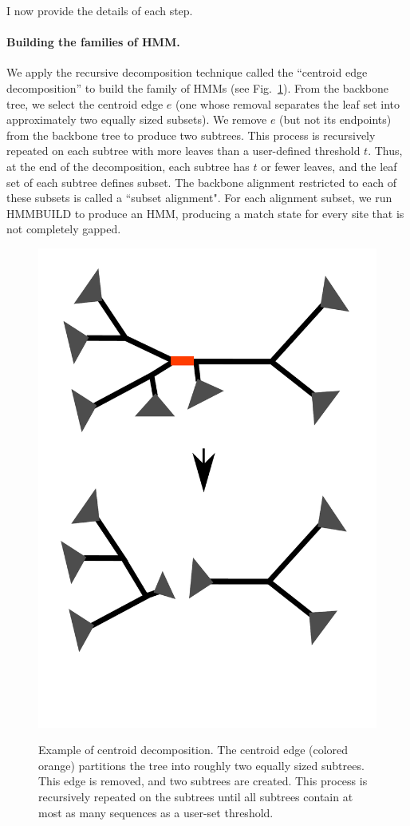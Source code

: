 I now provide the details of each step.

\paragraph{Building the families of HMM.}
We apply the recursive decomposition technique called the 
``centroid edge decomposition'' \cite{Liu2012} 
to build the family of HMMs (see Fig.~\ref{hmmfamily:decomp}).  
From the backbone tree, we select the centroid edge $e$ 
(one whose removal separates the leaf set into 
approximately two equally 
sized subsets).
We remove $e$ (but not its endpoints) from 
the backbone tree  to produce two subtrees.  
This process is recursively repeated on each subtree with
more leaves than a user-defined threshold $t$.  Thus, at the end
of the decomposition, each subtree has $t$ or fewer leaves, and the leaf set of each subtree defines subset.
The backbone alignment restricted to each of these subsets is
called a ``subset alignment".  For each alignment subset, we run HMMBUILD to produce an HMM, producing a match state for every site that is not completely gapped. 
 
\begin{figure}[htbp]
\centering
{\includegraphics[width=.50\textwidth]{hmmfamily/decomposition}}
\caption[Example of centroid decomposition.]{Example of centroid decomposition.  The centroid edge (colored orange) partitions the tree into roughly two equally sized subtrees.  This edge is removed, and two subtrees are created.  This process is recursively repeated on the subtrees until all subtrees contain at most as many sequences as a user-set threshold.} 
\label{hmmfamily:decomp}
\end{figure}


